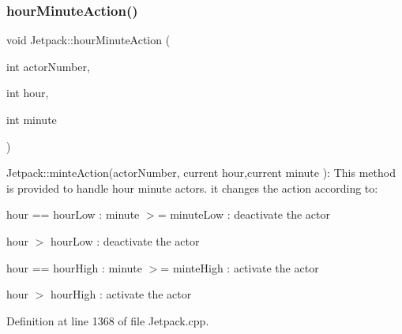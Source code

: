 \subsubsection{\texorpdfstring{hour\+Minute\+Action()}{hourMinuteAction()}}
{\footnotesize\ttfamily void Jetpack\+::hour\+Minute\+Action (\begin{DoxyParamCaption}\item[{int}]{actor\+Number,  }\item[{int}]{hour,  }\item[{int}]{minute }\end{DoxyParamCaption})}

Jetpack\+::minte\+Action(actor\+Number, current hour,current minute )\+: This method is provided to handle hour minute actors. it changes the action according to\+:

hour == hour\+Low \+: minute $>$= minute\+Low \+: deactivate the actor

hour $>$ hour\+Low \+: deactivate the actor

hour == hour\+High \+: minute $>$= minte\+High \+: activate the actor

hour $>$ hour\+High \+: activate the actor 

Definition at line 1368 of file Jetpack.\+cpp.


